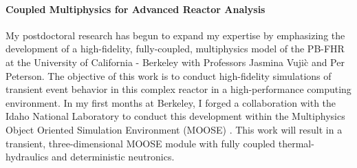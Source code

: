 \documentclass[a4paper, 10pt]{article}
\begin{document}
%

\paragraph{Coupled Multiphysics for Advanced Reactor Analysis}

My postdoctoral research has begun to expand my expertise by emphasizing the 
development of a high-fidelity, fully-coupled, multiphysics model of the PB-FHR 
at the University of California - Berkeley with Professors Jasmina Vuji\`c and Per 
Peterson. The objective of this work is to conduct high-fidelity simulations of 
transient event behavior in this complex reactor in a high-performance computing 
environment.  In my first months at Berkeley, I forged a collaboration with the 
Idaho National Laboratory to conduct this development within the Multiphysics 
Object Oriented Simulation Environment (MOOSE) \cite{gaston_moose:_2009}. This 
work will result in a transient, three-dimensional MOOSE module with fully 
coupled thermal-hydraulics and deterministic neutronics.  


\end{document}
